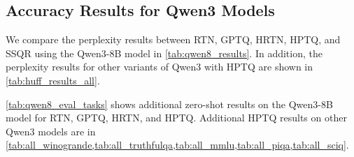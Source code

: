 \documentclass{article} %
\begin{document}
\clearpage

\subsection{Accuracy Results for Qwen3 Models}
\label{sec:app_experiments_metrics_qwen}

We compare the perplexity results between RTN, GPTQ, HRTN, HPTQ, and SSQR using the Qwen3-8B model in \cref{tab:qwen8_results}. In addition, the perplexity results for other variants of Qwen3 with HPTQ are shown in \cref{tab:huff_results_all}.

\cref{tab:qwen8_eval_tasks} shows additional zero-shot results on the Qwen3-8B model for RTN, GPTQ, HRTN, and HPTQ. Additional HPTQ results on other Qwen3 models are in \cref{tab:all_winogrande,tab:all_truthfulqa,tab:all_mmlu,tab:all_piqa,tab:all_sciq}. 
\end{document}
